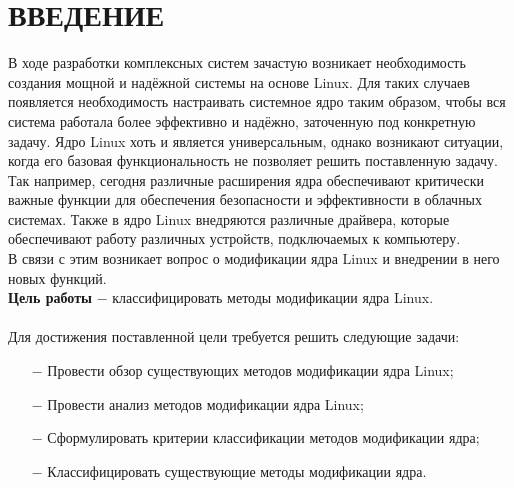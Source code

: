 \chapter*{ВВЕДЕНИЕ}

В ходе разработки комплексных систем зачастую возникает необходимость создания мощной и надёжной системы на основе Linux.
Для таких случаев появляется необходимость настраивать системное ядро таким образом,
чтобы вся система работала более эффективно и надёжно, заточенную под конкретную задачу.
Ядро Linux хоть и является универсальным, однако возникают ситуации, когда его базовая функциональность не позволяет решить поставленную задачу.\\
Так например, сегодня различные расширения ядра обеспечивают критически важные
функции для обеспечения безопасности и эффективности в облачных системах\cite{cloud-kernel}.
Также в ядро Linux внедряются различные драйвера, которые обеспечивают работу различных устройств, подключаемых к компьютеру. \\
В связи с этим возникает вопрос о модификации ядра Linux и внедрении в него новых функций.
\vspace{0.1cm}
\\
\textbf{Цель работы} $-$ классифицировать методы модификации ядра Linux.
\\
\vspace{0.1cm}
\\
Для достижения поставленной цели требуется решить следующие задачи: %
\begin{itemize}
    \item[$-$] Провести обзор существующих методов модификации ядра Linux;
    \item[$-$] Провести анализ методов модификации ядра Linux;
    \item[$-$] Сформулировать критерии классификации методов модификации ядра;
    \item[$-$] Классифицировать существующие методы модификации ядра.
\end{itemize}
